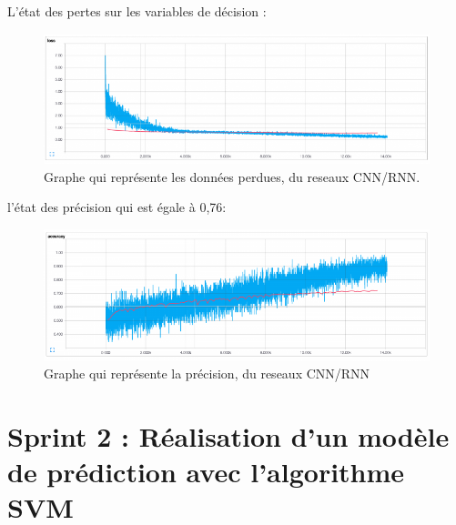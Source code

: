  L’état des pertes sur les variables de décision :

\begin{figure}[H]
	\begin{center}
	\includegraphics[width=\linewidth]{Images/cnn4.png}
	\end{center}
	\caption{Graphe qui représente les données perdues, du reseaux CNN/RNN.}
	\label{fig:rnn}
\end{figure}
 l'état des précision qui est égale à 0,76:
\begin{figure}[H]
	\begin{center}
	\includegraphics[width=\linewidth]{Images/cnn5.png}
	\end{center}
	\caption{Graphe qui représente la précision, du reseaux CNN/RNN}
	\label{fig:rnn}
\end{figure}







\chapter{Sprint 2 : Réalisation d’un modèle de prédiction avec l’algorithme SVM}
\label{Chapitre 5} %


